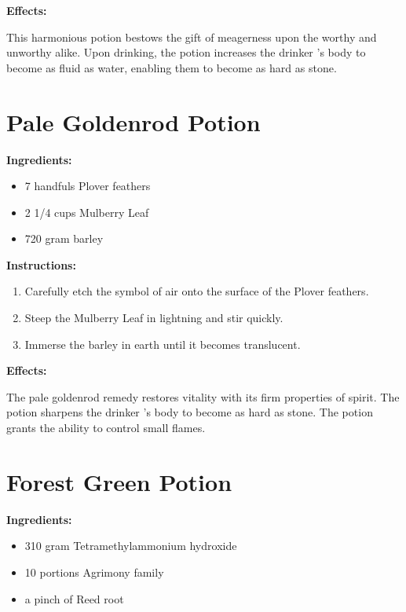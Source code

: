 \documentclass{article}
\begin{document}
\textbf{Effects:}

This harmonious potion bestows the gift of meagerness upon the worthy and unworthy alike. Upon drinking, the potion increases the drinker 's body to become as fluid as water, enabling them to become as hard as stone.

\newpage
\section*{Pale Goldenrod Potion}

\textbf{Ingredients:}

\begin{itemize}
  \item 7 handfuls Plover feathers
  \item 2 1/4 cups Mulberry Leaf
  \item 720 gram barley
\end{itemize}

\textbf{Instructions:}

\begin{enumerate}
  \item Carefully etch the symbol of air onto the surface of the Plover feathers.
  \item Steep the Mulberry Leaf in lightning and stir quickly.
  \item Immerse the barley in earth until it becomes translucent.
\end{enumerate}

\textbf{Effects:}

The pale goldenrod remedy restores vitality with its firm properties of spirit. The potion sharpens the drinker 's body to become as hard as stone. The potion grants the ability to control small flames.

\newpage
\section*{Forest Green Potion}

\textbf{Ingredients:}

\begin{itemize}
  \item 310 gram Tetramethylammonium hydroxide
  \item 10 portions Agrimony family
  \item a pinch of Reed root
\end{itemize}
\end{document}
